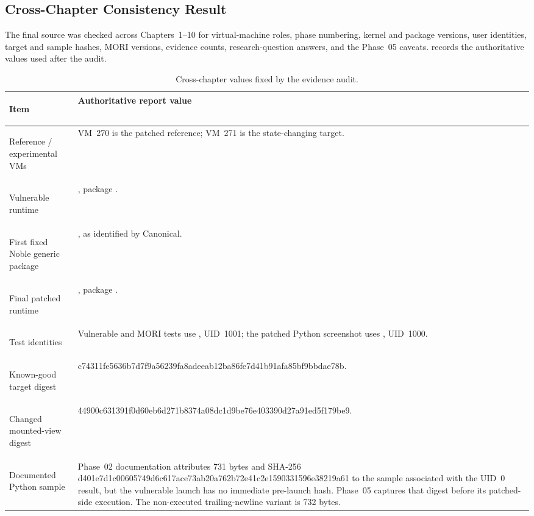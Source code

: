 \subsection{Cross-Chapter Consistency Result}
\label{app:consistency-result}

The final source was checked across Chapters~1--10 for virtual-machine roles,
phase numbering, kernel and package versions, user identities, target and
sample hashes, MORI versions, evidence counts, research-question answers, and
the Phase~05 caveats.  records the
authoritative values used after the audit.

\begin{table}[H]
    \centering
    \caption{Cross-chapter values fixed by the evidence audit.}
    \label{tab:cross-chapter-consistency}
    \small
    \begin{tabularx}{\textwidth}{@{}>{\bfseries\raggedright\arraybackslash}p{}Y@{}}
        \toprule
        Item & Authoritative report value \\
        \midrule
        Reference / experimental VMs & VM~270  is the patched reference; VM~271  is the state-changing target. \\
        Vulnerable runtime & , package . \\
        First fixed Noble generic package & , as identified by Canonical. \\
        Final patched runtime & , package . \\
        Test identities & Vulnerable and MORI tests use , UID~1001; the patched Python screenshot uses , UID~1000. \\
        Known-good target digest & {\scriptsize\ttfamily c74311fe5636b7d7f9a56239fa8adeeab12ba86fe7d41b91afa85bf9bbdae78b}. \\
        Changed mounted-view digest & {\scriptsize\ttfamily 44900c631391f0d60eb6d271b8374a08dc1d9be76e403390d27a91ed5f179be9}. \\
        Documented Python sample & Phase~02 documentation attributes 731 bytes and SHA-256 {\scriptsize\ttfamily d401e7d1c00605749d6c617ace73ab20a762b72e41c2e1590331596e38219a61} to the sample associated with the UID~0 result, but the vulnerable launch has no immediate pre-launch hash. Phase~05 captures that digest before its patched-side execution. The non-executed trailing-newline variant is 732 bytes. \\

\end{tabularx}
\end{table}

